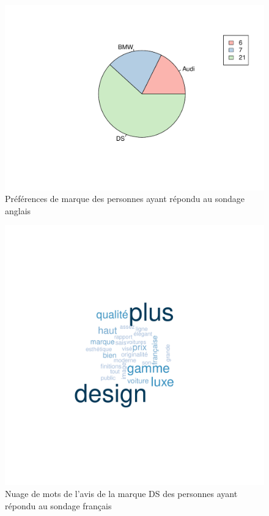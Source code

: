 \documentclass[12pt]{article}\usepackage[]{graphicx}\usepackage[]{color}
\makeatletter
\def\maxwidth{ %
  \ifdim\Gin@nat@width>\linewidth
    \linewidth
  \else
    \Gin@nat@width
  \fi
}
\newenvironment{knitrout}{}{} %
\makeatother
\begin{document}
\begin{knitrout}
\color{fgcolor}\begin{figure}[H]
\includegraphics[width=\maxwidth]{figure/preference_en-1} \caption[Préférences de marque des personnes ayant répondu au sondage anglais]{Préférences de marque des personnes ayant répondu au sondage anglais}\label{fig:preference en}
\end{figure}


\end{knitrout}

\begin{knitrout}
\color{fgcolor}\begin{figure}[H]
\includegraphics[width=\maxwidth]{figure/differences_fr-1} \caption[Nuage de mots de l'avis de la marque DS des personnes ayant répondu au sondage français]{Nuage de mots de l'avis de la marque DS des personnes ayant répondu au sondage français}\label{fig:differences fr}
\end{figure}


\end{knitrout}
\end{document}
